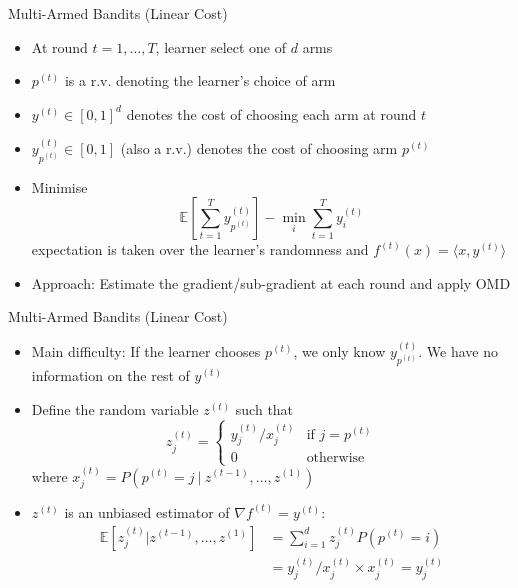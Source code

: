 \begin{frame}{Multi-Armed Bandits (Linear Cost)}
    \begin{itemize}
        \item At round $t = 1, \dots, T$, learner select one of $d$ arms 
        \item $p^{(t)}$ is a r.v. denoting the learner's choice of arm
        \item $y^{(t)} \in [0, 1]^d$ denotes the cost of choosing each arm at round $t$
        \item $y^{(t)}_{p^{(t)}} \in [0, 1]$ (also a r.v.) denotes the cost of choosing arm $p^{(t)}$
        \item Minimise $$ \mathbb{E}\left[ \sum_{t=1}^T y^{(t)}_{p^{(t)}}\right] - \min_{i} \sum_{t=1}^T y^{(t)}_i $$
        expectation is taken over the learner's randomness and $f^{(t)}(x) = \langle x, y^{(t)} \rangle$ \pause
        \item Approach: Estimate the gradient/sub-gradient at each round and apply OMD
    \end{itemize}
\end{frame}

\begin{frame}{Multi-Armed Bandits (Linear Cost)}
    \begin{itemize}
        \item Main difficulty: If the learner chooses $p^{(t)}$, we only know $y^{(t)}_{p^{(t)}}$. We have no information on the rest of $y^{(t)}$
        \item Define the random variable $z^{(t)}$ such that
        $$
        z^{(t)}_j =
        \begin{cases}
        y^{(t)}_j / x^{(t)}_j & \text{if } j = p^{(t)} \\
        0 & \text{otherwise}
        \end{cases}
        $$
        where $x^{(t)}_j = P(p^{(t)} = j \ | \ z^{(t-1)}, \dots, z^{(1)})$
        \item $z^{(t)}$ is an unbiased estimator of $\nabla f^{(t)} = y^{(t)}$:
        \begin{align*}
            \mathbb{E}\left[ z^{(t)}_j | z^{(t-1)}, \dots, z^{(1)} \right] &= \sum_{i=1}^d z^{(t)}_j P(p^{(t)} = i) \\
            &= y^{(t)}_j / x^{(t)}_j \times x^{(t)}_j = y^{(t)}_j
        \end{align*}
    \end{itemize}
\end{frame}

